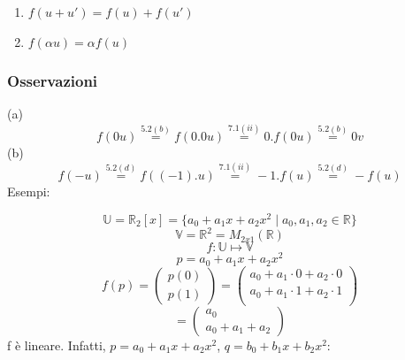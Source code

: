 \documentclass[12pt]{article}
\begin{document}
\begin{enumerate}
    \item $f(u + u') = f(u) + f(u')$
    \item $f(\alpha u) = \alpha f(u)$
\end{enumerate}

\subsubsection{Osservazioni}

(a)
\[f(0u) \stackrel{5.2(b)}{=} f(0.0u) \stackrel{7.1(ii)}{=} 0.f(0u) \stackrel{5.2(b)}{=} 0v\]
(b)
\[f(-u) \stackrel{5.2(d)}{=} f((-1).u) \stackrel{7.1(ii)}{=} -1.f(u) \stackrel{5.2(d)}{=} -f(u)\]
Esempi:

\[\mathbb{U} = \mathbb{R}_2[x] = \{a_0 + a_1x + a_2x^2 \mid a_0, a_1, a_2 \in \mathbb{R}\}\]
\[\mathbb{V} = \mathbb{R}^2 = M_{2x1} (\mathbb{R})\]
\[f: \mathbb{U} \mapsto \mathbb{V}\]
\[p = a_0 + a_1x + a_2x^2\]
\[f(p) = \begin{pmatrix}
    p(0)\\
    p(1)
\end{pmatrix} = \begin{pmatrix}
    a_0 + a_1 \cdot 0 + a_2 \cdot 0\\
    a_0 + a_1 \cdot 1 + a_2 \cdot 1\\
\end{pmatrix}\]
\[= \begin{pmatrix}
    a_0\\
    a_0 + a_1 + a_2
\end{pmatrix}\]
f è lineare. Infatti, $p = a_0 + a_1x + a_2x^2$, $q = b_0 + b_1x + b_2x^2$:
\end{document}

